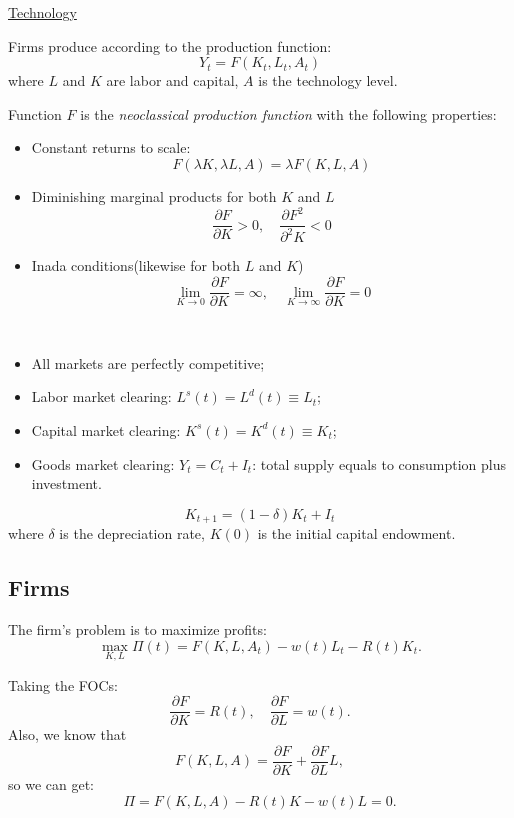 \underline{Technology}

Firms produce according to the production function:
\[Y_t = F(K_t, L_t, A_t)\]
where $L$ and $K$ are labor and capital, $A$ is the technology level.

Function $F$ is the \textit{neoclassical production function} with the following properties:
\begin{itemize}
    \item Constant returns to scale:
            \[F(\lambda K, \lambda L, A) = \lambda F(K, L, A)\]
    \item Diminishing marginal products for both $K$ and $L$
            \[\frac{\partial F}{\partial K} > 0, \quad \frac{\partial F^2}{\partial^2 K}<0\]
    \item Inada conditions(likewise for both $L$ and $K$)
            \[\lim_{K \to 0} \frac{\partial F}{\partial K} = \infty, \quad \lim_{K \to \infty} \frac{\partial F}{\partial K} = 0\]
\end{itemize}

\begin{assumption}
    \ 

    \begin{itemize}
        \item All markets are perfectly competitive;
        \item Labor market clearing: $L^s(t) = L^d(t) \equiv L_t$;
        \item Capital market clearing: $K^s(t) = K^d(t) \equiv K_t$;
        \item Goods market clearing: $Y_t = C_t + I_t$: total supply equals to consumption plus investment.
    \end{itemize}
\end{assumption}

\begin{theorem}\label{Fundamental Law of Motion}
    \[K_{t+1} = (1-\delta)K_t + I_t\]
    where $\delta$ is the depreciation rate, $K(0)$ is the initial capital endowment.    
\end{theorem}

\subsection{Firms}

The firm's problem is to maximize profits:
\[\max_{K, L} \Pi(t) = F(K, L, A_t) - w(t)L_t - R(t)K_t.\]

Taking the FOCs:
\[\frac{\partial F}{\partial K} = R(t), \quad \frac{\partial F}{\partial L} = w(t).\]
Also, we know that 
\[F(K, L, A) = \frac{\partial F}{\partial K} + \frac{\partial F}{\partial L}L,\]
so we can get:
\[\Pi = F(K, L, A) - R(t)K - w(t)L = 0.\]

